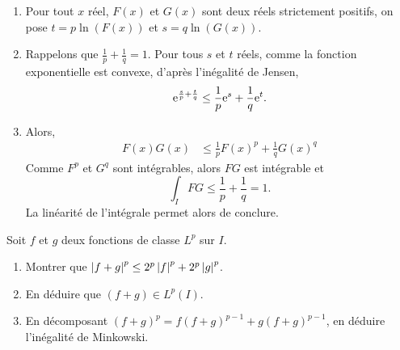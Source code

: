 \begin{demo}
\begin{enumerate}
\item Pour tout $x$ réel, $F(x)$ et $G(x)$ sont deux réels strictement positifs, on pose $t = p \ln(F(x))$ et $s = q \ln(G(x))$.

\item Rappelons que $\frac{1}{p} + \frac{1}{q} = 1$. Pour tous $s$ et $t$ réels, comme la fonction exponentielle est convexe, d'après l'inégalité de Jensen,
\[
\mathrm{e}^{\frac{s}{p} + \frac{t}{q}} \leq \frac{1}{p} \mathrm{e}^s + \frac{1}{q} \mathrm{e}^t.
\]

\item Alors,
\begin{align*}
F(x) G(x) &\leq \frac{1}{p} F(x)^p + \frac{1}{q} G(x)^q
\end{align*}
Comme $F^p$ et $G^q$ sont intégrables, alors $F G$ est intégrable et
\[
\int_I F G \leq \frac{1}{p} + \frac{1}{q} = 1.
\]
La linéarité de l'intégrale permet alors de conclure.
\end{enumerate}
\end{demo}

\begin{exercice}
Soit $f$ et $g$ deux fonctions de classe $L^p$ sur $I$.
\begin{enumerate}
\item Montrer que $\left| f + g \right|^p \leq 2^p \left| f \right|^p + 2^p \left| g \right|^p$.

\item En déduire que $(f + g) \in L^p(I)$.

\item En décomposant $(f + g)^p = f (f + g)^{p-1} + g (f + g)^{p-1}$, en déduire l'inégalité de Minkowski.
\end{enumerate}
\end{exercice}

